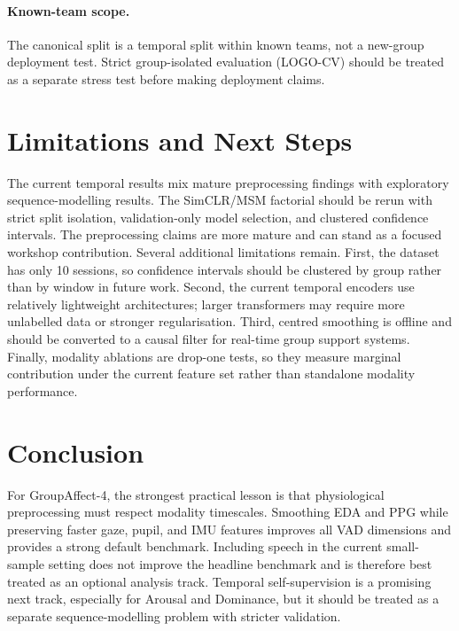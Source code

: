 \documentclass[sigconf,review,anonymous]{acmart}
\begin{document}
\paragraph{Known-team scope.}
The canonical split is a temporal split within known teams, not a new-group
deployment test.
Strict group-isolated evaluation (LOGO-CV) should be treated as a separate
stress test before making deployment claims.

\section{Limitations and Next Steps}
\label{sec:limitations}

The current temporal results mix mature preprocessing findings with
exploratory sequence-modelling results.
The SimCLR/MSM factorial should be rerun with strict split isolation,
validation-only model selection, and clustered confidence intervals.
The preprocessing claims are more mature and can stand as a focused workshop
contribution.
Several additional limitations remain.
First, the dataset has only 10 sessions, so confidence intervals should be
clustered by group rather than by window in future work.
Second, the current temporal encoders use relatively lightweight architectures;
larger transformers may require more unlabelled data or stronger regularisation.
Third, centred smoothing is offline and should be converted to a causal filter
for real-time group support systems.
Finally, modality ablations are drop-one tests, so they measure marginal
contribution under the current feature set rather than standalone modality
performance.

\section{Conclusion}
\label{sec:conclusion}

For GroupAffect-4, the strongest practical lesson is that physiological
preprocessing must respect modality timescales.
Smoothing EDA and PPG while preserving faster gaze, pupil, and IMU features
improves all VAD dimensions and provides a strong default benchmark.
Including speech in the current small-sample setting does not improve the
headline benchmark and is therefore best treated as an optional analysis track.
Temporal self-supervision is a promising next track, especially for Arousal and
Dominance, but it should be treated as a separate sequence-modelling problem
with stricter validation.



\end{document}
